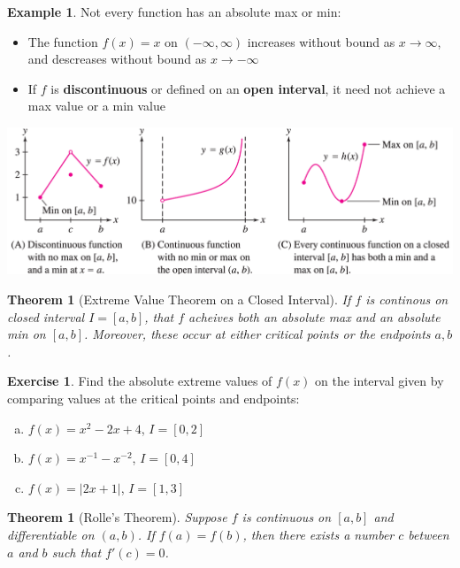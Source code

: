 \documentclass[11pt,reqno,final]{amsart}
\numberwithin{figure}{section}
\newtheorem{theorem}[equation]{Theorem}%
\theoremstyle{definition} %
\newtheorem{example}[equation]{Example}%
\newtheorem{exercise}[question]{Exercise}
\begin{document}
\begin{example}
        Not every function has an absolute max or min:
        \begin{itemize}
        \item The function $f(x) = x$ on $(-\infty,\infty)$ increases without bound as $x \to \infty$, and descreases without bound as $x \to -\infty$
        \item If $f$ is \textbf{discontinuous} or defined on an \textbf{open interval}, it need not achieve a max value or a min value
        \end{itemize}
        \includegraphics[width=\textwidth]{11-09P_ext.png}
\end{example}

\begin{theorem}[Extreme Value Theorem on a Closed Interval]
        If $f$ is continous on closed interval $I = [a,b]$, that $f$ acheives both an absolute max and an absolute min on $[a,b]$.
        Moreover, these occur at either \textit{critical points} or the \textit{endpoints} $a,b$.
\end{theorem}

\begin{exercise}
        Find the absolute extreme values of $f(x)$ on the interval given
        by comparing values at the critical points and endpoints:
        \begin{enumerate}[(a)]
        \item $f(x) = x^2 - 2x + 4$, $I = [0,2]$
                \vfill
        \item $f(x) = x^{-1} - x^{-2}$, $I = [0,4]$
                \vfill
        \item $f(x) = |2x+1|$, $I = [1,3]$
                \vfill
        \end{enumerate}
\end{exercise}

\newpage

\begin{theorem}[Rolle's Theorem]
        Suppose $f$ is continuous on $[a,b]$ and differentiable on $(a,b)$.
        If $f(a) = f(b)$, then there exists a number $c$ between $a$ and $b$ such that $f'(c) = 0$.
\end{theorem}
 
\end{document}

